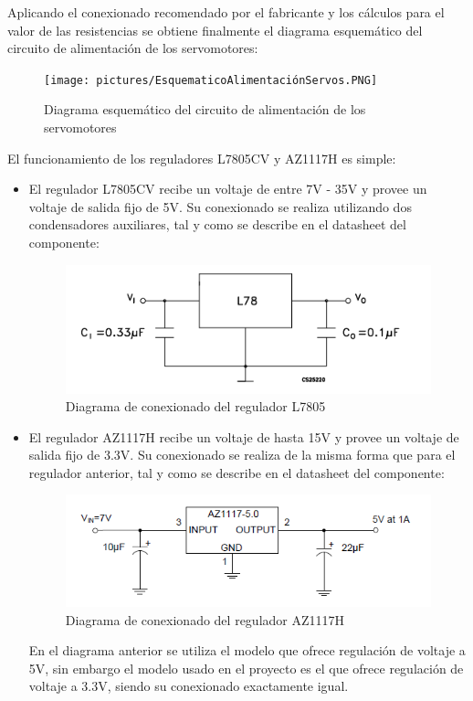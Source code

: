 Aplicando el conexionado recomendado por el fabricante y los cálculos para el valor de las resistencias se obtiene finalmente el diagrama esquemático del circuito de alimentación de los servomotores:

\begin{figure}[H]
    \centering 
    \texttt{[image: pictures/EsquematicoAlimentaciónServos.PNG]}
    \caption{Diagrama esquemático del circuito de alimentación de los servomotores}
    \label{fig:kdiagram}
\end{figure}

El funcionamiento de los reguladores L7805CV y AZ1117H es simple:
\begin{itemize}
    \item El regulador L7805CV recibe un voltaje de entre 7V - 35V y provee un voltaje de salida fijo de 5V. Su conexionado se realiza utilizando dos condensadores auxiliares, tal y como se describe en el datasheet del componente:
    
    \begin{figure}[H]
    \centering 
    \includegraphics[width=.75\linewidth]{pictures/L7805Datasheet.PNG}
    \caption{Diagrama de conexionado del regulador L7805}
    \label{fig:kdiagram}
    \end{figure}
    
    \item El regulador AZ1117H recibe un voltaje de hasta 15V y provee un voltaje de salida fijo de 3.3V. Su conexionado se realiza de la misma forma que para el regulador anterior, tal y como se describe en el datasheet del componente:
    
    \begin{figure}[H]
    \centering 
    \includegraphics[width=.75\linewidth]{pictures/AZ1117Hdatasheet.PNG}
    \caption{Diagrama de conexionado del regulador AZ1117H}
    \label{fig:kdiagram}
    \end{figure}
    
    En el diagrama anterior se utiliza el modelo que ofrece regulación de voltaje a 5V, sin embargo el modelo usado en el proyecto es el que ofrece regulación de voltaje a 3.3V, siendo su conexionado exactamente igual.
    
\end{itemize}

